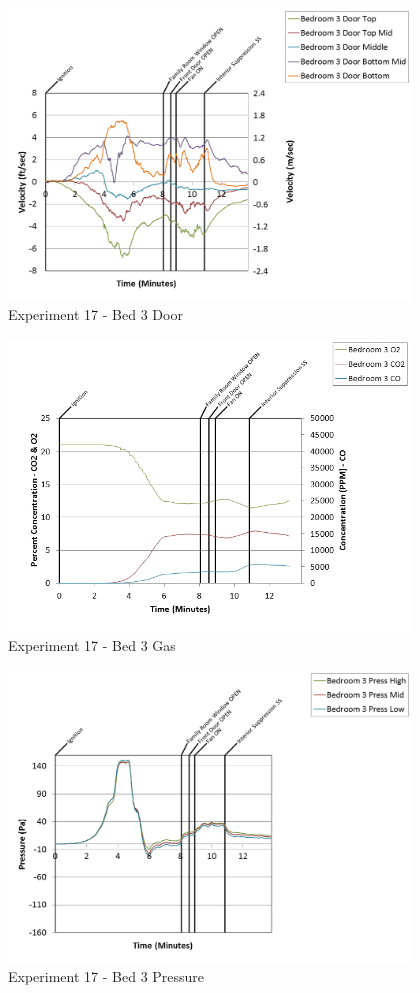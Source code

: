 \documentclass{article}
\begin{document}
\begin{appendices}
\begin{figure}[h!]
	\centering
	\includegraphics[height=3.05in]{0_Images/Results_Charts/Exp_17_Charts/Bed3Door.png}
	\caption{Experiment 17 - Bed 3 Door}
\end{figure}

\clearpage

\begin{figure}[h!]
	\centering
	\includegraphics[height=3.05in]{0_Images/Results_Charts/Exp_17_Charts/Bed3Gas.png}
	\caption{Experiment 17 - Bed 3 Gas}
\end{figure}


\begin{figure}[h!]
	\centering
	\includegraphics[height=3.05in]{0_Images/Results_Charts/Exp_17_Charts/Bed3Pressure.png}
	\caption{Experiment 17 - Bed 3 Pressure}
\end{figure}


\end{appendices}
\end{document}
